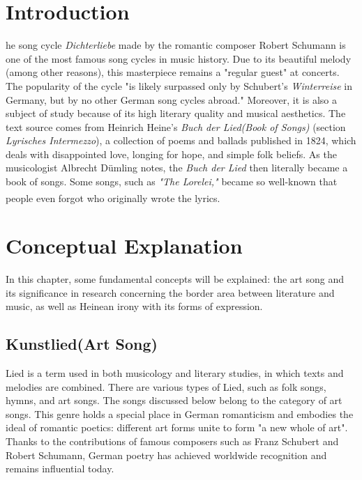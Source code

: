 \documentclass[10pt,a4paper,twocolumn]{rho}
\begin{document}
    \fancyfootoffset{0pt}
    \onecolumn
    
\section{Introduction}
he song cycle \textit{Dichterliebe} made by the romantic composer Robert Schumann is one of the most famous song cycles in music history. Due to its beautiful melody (among other reasons), this masterpiece remains a "regular guest" at concerts. The popularity of the cycle "is likely surpassed only by Schubert's \textit{Winterreise} in Germany, but by no other German song cycles abroad." Moreover, it is also a subject of study because of its high literary quality and musical aesthetics. The text source comes from Heinrich Heine's \textit{Buch der Lied(Book of Songs)} (section \textit{Lyrisches Intermezzo}), a collection of poems and ballads published in 1824, which deals with disappointed love, longing for hope, and simple folk beliefs. As the musicologist Albrecht Dümling notes, the \textit{Buch der Lied} then literally became a book of songs. Some songs, such as\textit{ "The Lorelei,"} became so well-known that people even forgot who originally wrote the lyrics.\textsuperscript{\cite{ref1}}

\section{Conceptual Explanation}
 In this chapter, some fundamental concepts will be explained: the art song and its significance in research concerning the border area between literature and music, as well as Heinean irony with its forms of expression.

\subsection{Kunstlied(Art Song)}
 Lied is a term used in both musicology and literary studies, in which texts and melodies are combined. There are various types of Lied, such as folk songs, hymns, and art songs. The songs discussed below belong to the category of art songs. This genre holds a special place in German romanticism and embodies the ideal of romantic poetics: different art forms unite to form "a new whole of art". Thanks to the contributions of famous composers such as Franz Schubert and Robert Schumann, German poetry has achieved worldwide recognition and remains influential today.
\end{document}

